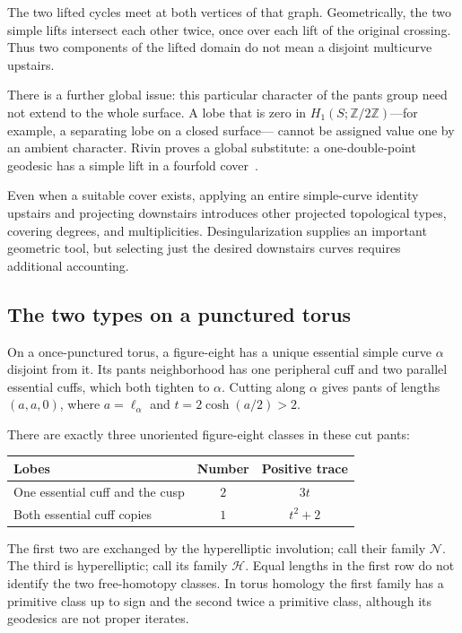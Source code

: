 \documentclass[11pt,a4paper]{article}
\numberwithin{equation}{section}
\theoremstyle{definition}
\theoremstyle{remark}
\newcommand{\ZZ}{\mathbb Z}
\begin{document}
The two lifted cycles meet at both vertices of that graph. Geometrically,
the two simple lifts intersect each other twice, once over each lift of
the original crossing. Thus two components of the lifted domain do not
mean a disjoint multicurve upstairs.

There is a further global issue: this particular character of the pants
group need not extend to the whole surface. A lobe that is zero in
$H_1(S;\ZZ/2\ZZ)$---for example, a separating lobe on a closed surface---
cannot be assigned value one by an ambient character.
Rivin proves a global substitute: a one-double-point geodesic has a simple
lift in a fourfold cover~\cite[Theorem 4.2]{RivinFigures}.

Even when a suitable cover exists, applying an entire simple-curve identity
upstairs and projecting downstairs introduces other projected topological
types, covering degrees, and multiplicities. Desingularization supplies
an important geometric tool, but selecting just the desired downstairs
curves requires additional accounting.

\subsection{The two types on a punctured torus}

On a once-punctured torus, a figure-eight has a unique essential simple
curve $\alpha$ disjoint from it. Its pants neighborhood has one peripheral
cuff and two parallel essential cuffs, which both tighten to $\alpha$.
Cutting along $\alpha$ gives pants of lengths $(a,a,0)$, where
$a=\ell_\alpha$ and $t=2\cosh(a/2)>2$.

There are exactly three unoriented figure-eight classes in these cut pants:
\begin{center}
\begin{tabular}{@{}p{}c c@{}}
\toprule
Lobes & Number & Positive trace\\
\midrule
One essential cuff and the cusp & $2$ & $3t$\\
Both essential cuff copies & $1$ & $t^2+2$\\
\bottomrule
\end{tabular}
\end{center}
The first two are exchanged by the hyperelliptic involution; call their
family $\mathcal N$. The third is hyperelliptic; call its family
$\mathcal H$. Equal lengths in the first row do not identify the two
free-homotopy classes. In torus homology the first family has a primitive
class up to sign and the second twice a primitive class, although its
geodesics are not proper iterates.
\end{document}
